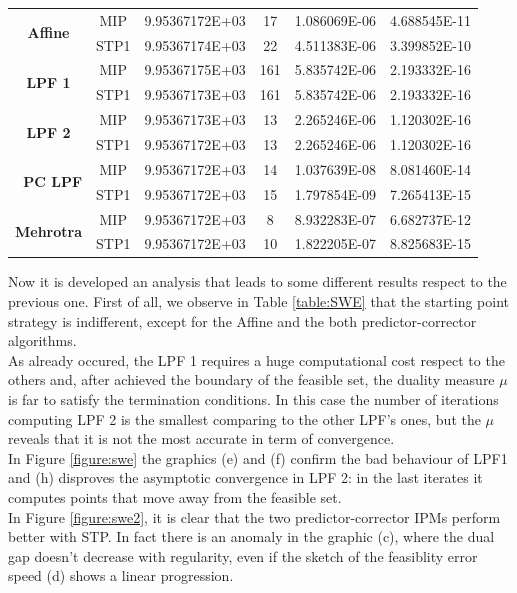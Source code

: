 \documentclass[a4paper,10 pt,titlepage,twoside]{book}
\theoremstyle{plain}
\theoremstyle{definition}
\theoremstyle{remark}
\begin{document}
{{\begin{table}[t]
\begin{tabular}{cclcll}
		\multicolumn{1}{c|}{\multirow{2}{*}{\textbf{Affine}}} & MIP & 9.95367172E+03 & 17 & 1.086069E-06 & 4.688545E-11 \\
		\multicolumn{1}{c|}{} & STP1 & 9.95367174E+03 & 22 & 4.511383E-06 & 3.399852E-10 \\ \hline
		\multicolumn{1}{c|}{\multirow{2}{*}{\textbf{LPF 1}}} & MIP & 9.95367175E+03 & 161 & 5.835742E-06 & 2.193332E-16 \\
		\multicolumn{1}{c|}{} & STP1 & 9.95367173E+03 & 161 & 5.835742E-06 & 2.193332E-16 \\ \hline
		\multicolumn{1}{c|}{\multirow{2}{*}{\textbf{LPF 2}}} & MIP & 9.95367173E+03 & 13 & 2.265246E-06 & 1.120302E-16 \\
		\multicolumn{1}{c|}{} & STP1 & 9.95367172E+03 & 13 & 2.265246E-06 & 1.120302E-16 \\ \hline
		\multicolumn{1}{r|}{\multirow{2}{*}{\textbf{PC LPF}}} & MIP & 9.95367172E+03 & 14 & 1.037639E-08 & 8.081460E-14 \\
		\multicolumn{1}{r|}{} & STP1 & 9.95367172E+03 & 15 & 1.797854E-09 & 7.265413E-15 \\ \hline
		\multicolumn{1}{c|}{\multirow{2}{*}{\textbf{Mehrotra}}} & MIP & 9.95367172E+03 & 8 & 8.932283E-07 & 6.682737E-12 \\
		\multicolumn{1}{c|}{} & STP1 & 9.95367172E+03 & 10 & 1.822205E-07 & 8.825683E-15 \\ \hline
	\end{tabular}
\end{table}
Now it is developed an analysis that leads to 
some different results respect to the previous one. First of all, we observe in Table \ref{table:SWE} that the starting point strategy is indifferent, except for the Affine and the both predictor-corrector algorithms.\\As already occured, the LPF 1 requires a huge computational cost respect to the others and, after achieved the boundary of the feasible set, the duality measure $\mu$ is far to satisfy the termination conditions. In this case the number of iterations computing LPF 2 is the smallest comparing to the other LPF's ones, but the $\mu$ reveals that it is not the most accurate in term of convergence.\\
In Figure \ref{figure:swe} the graphics (e) and (f) confirm the bad behaviour of LPF1 and (h) disproves the asymptotic convergence in LPF 2: in the last iterates it computes points that move away from the feasible set.\\
In Figure \ref{figure:swe2}, it is clear that the two predictor-corrector IPMs perform better with STP. In fact there is an anomaly in the graphic (c), where the dual gap doesn't decrease with regularity, even if the sketch of the feasiblity error speed (d) shows a linear progression. \\
}}
\end{document}
